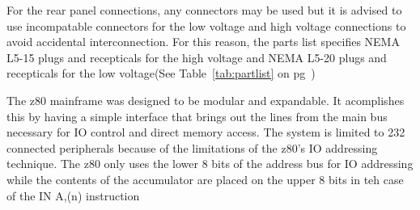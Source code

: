 \documentclass{book}
\begin{document}
For the rear panel connections, any connectors may be used but it is advised to use incompatable connectors for the low voltage and high voltage connections to avoid accidental interconnection. For this reason, the parts list specifies NEMA L5-15 plugs and recepticals for the high voltage and NEMA L5-20 plugs and recepticals for the low voltage(See Table~\ref{tab:partlist} on pg~\pageref{tab:partlist})

The z80 mainframe was designed to be modular and expandable. It acomplishes this by having a simple interface that brings out the lines from the main bus necessary for IO control and direct memory access. The system is limited to 232 connected peripherals because of the limitations of the z80's IO addressing technique. The z80 only uses the lower 8 bits of the address bus for IO addressing while the contents of the accumulator are placed on the upper 8 bits in teh case of  the IN A,(n) instruction\cite[p.~295]{zlg:z80}
\end{document}
